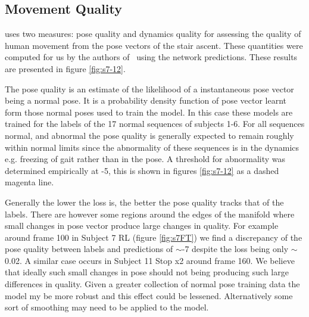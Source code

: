 \documentclass[11pt]{article} %
\begin{document}
\subsection{Movement Quality}

\cite{Paiement} uses two measures: pose quality and dynamics quality for assessing the quality of human movement from the pose vectors of the stair ascent. These quantities were computed for us by the authors of~\cite{Paiement} using the network predictions. These results are presented in figure \ref{fig:s7-12}. 

The pose quality is an estimate of the likelihood of a instantaneous pose vector being a normal pose. It is a probability density function of pose vector learnt form those normal poses used to train the model. In this case these models are trained for the labels of the 17 normal sequences of subjects 1-6. For all sequences normal, and abnormal the pose quality is generally expected to remain roughly within normal limits since the abnormality of these sequences is in the dynamics e.g. freezing of gait rather than in the pose. A threshold for abnormality was determined empirically at -5, this is shown in figures \ref{fig:s7-12} as a dashed magenta line.

Generally the lower the loss is, the better the pose quality tracks that of the labels. There are however some regions around the edges of the manifold where small changes in pose vector produce large changes in quality. For example around frame 100 in Subject 7 RL (figure \ref{fig:s7FT}) we find a discrepancy of the pose quality between labels and predictions of $\sim$-7 despite the loss being only $\sim$0.02. A similar case occurs in Subject 11 Stop x2 around frame 160. We believe that ideally such small changes in pose should not being producing such large differences in quality. Given a greater collection of normal pose training data the model my be more robust and this effect could be lessened. Alternatively some sort of smoothing may need to be applied to the model. 
\end{document}
